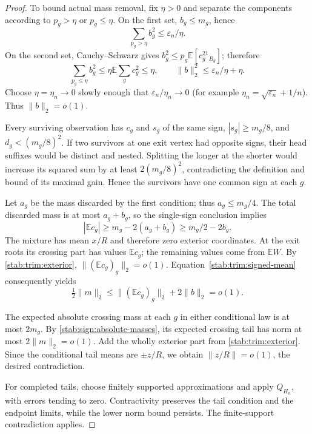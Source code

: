 \begin{proof}
To bound actual mass removal, fix $\eta>0$ and separate the
components according to $p_g>\eta$ or $p_g\le\eta$.
On the first set, $b_g\le m_g$, hence
\[
 \sum_{p_g>\eta}b_g^2\le\varepsilon_n/\eta.
\]
On the second set, Cauchy--Schwarz gives
$b_g^2\le p_g\mathbb E[c_g^21_{B_g}]$; therefore
\begin{equation}\label{stab:trim:bad-mass}
 \sum_{p_g\le\eta}b_g^2
       \le\eta\mathbb E\sum_gc_g^2\le\eta,
 \qquad
 \|b\|_2^2\le\varepsilon_n/\eta+\eta.
\end{equation}
Choose $\eta=\eta_n\to0$ slowly enough that
$\varepsilon_n/\eta_n\to0$ (for example
$\eta_n=\sqrt{\varepsilon_n}+1/n$). Thus $\|b\|_2=o(1)$.

Every surviving observation has $c_g$ and $s_g$ of the same sign,
$|s_g|\ge m_g/8$, and $d_g<(m_g/8)^2$. If two survivors at
one exit vertex had opposite signs, their head suffixes would be
distinct and nested. Splitting the longer at the shorter would
increase its squared sum by at least $2(m_g/8)^2$, contradicting
the definition and bound of its maximal gain. Hence the survivors
have one common sign at each $g$.

Let $a_g$ be the mass discarded by the first condition; thus
$a_g\le m_g/4$. The total discarded mass is at most $a_g+b_g$,
so the single-sign conclusion implies
\begin{equation}\label{stab:trim:signed-mean}
 |\mathbb Ec_g|\ge m_g-2(a_g+b_g)
                 \ge m_g/2-2b_g.
\end{equation}
The mixture has mean $x/R$ and therefore zero exterior coordinates.
At the exit roots its crossing part has values $\mathbb Ec_g$;
the remaining values come from $\mathbb EW$. By
\eqref{stab:trim:exterior}, $\|(\mathbb Ec_g)_g\|_2=o(1)$.
Equation~\eqref{stab:trim:signed-mean} consequently yields
\begin{equation}\label{stab:trim:mass-vanishes}
 \tfrac12\|m\|_2
       \le\|(\mathbb Ec_g)_g\|_2+2\|b\|_2=o(1).
\end{equation}

The expected absolute crossing mass at each $g$ in either
conditional law is at most $2m_g$. By
\eqref{stab:sign:absolute-masses}, its expected crossing tail has
norm at most $2\|m\|_2=o(1)$. Add the wholly exterior part from
\eqref{stab:trim:exterior}. Since the conditional tail means are
$\pm z/R$, we obtain $\|z/R\|=o(1)$, the desired contradiction.

For completed tails, choose finitely supported approximations and
apply $Q_{H_n}$, with errors tending to zero. Contractivity preserves
the tail condition and the endpoint limits, while the lower norm
bound persists. The finite-support contradiction applies.
\end{proof}

